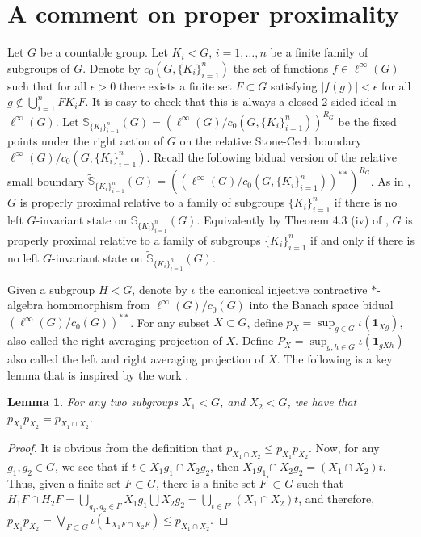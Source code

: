 \documentclass[11pt]{amsart}
\newtheorem{lem}[thm]{Lemma}
\theoremstyle{definition}
\begin{document}
\section{A comment on proper proximality}\label{pp section}

Let $G$ be a countable group.  Let $K_i<G$, $i=1,\hdots, n$ be a finite family of subgroups of $G$. Denote by $c_0(G,\{K_i\}_{i=1}^{n})$ the set of functions $f\in \ell^\infty(G)$ such that for all $\epsilon>0$ there exists a finite set $F\subset G$ satisfying $|f(g)|<\epsilon$ for all $g\notin \bigcup_{i=1}^{n}FK_iF$. It is easy to check that this is always a closed 2-sided ideal in $\ell^\infty(G)$. Let $\mathbb{S}_{\{K_{i}\}_{i=1}^{n}}(G)=\left(\ell^{\infty}(G)/c_0(G,\{K_i\}_{i=1}^{n})\right)^{R_{G}}$ be the fixed points under the right action of $G$ on the relative Stone-Cech boundary $\ell^{\infty}(G)/c_0(G,\{K_i\}_{i=1}^{n})$. Recall the following  bidual version of the relative small boundary $\widetilde{\mathbb{S}}_{\{K_{i}\}_{i=1}^{n}}(G)= \left(\left(\ell^{\infty}(G)/c_0(G,\{K_i\}_{i=1}^{n})\right)^{**}\right)^{R_{G}}$. As in \cite{BIP18}, $G$ is properly proximal relative to a family of subgroups $\{K_i\}_{i=1}^{n}$ if there is no left $G$-invariant state on $\mathbb{S}_{\{K_{i}\}_{i=1}^{n}}(G)$. Equivalently by Theorem 4.3 (iv) of \cite{BIP18},   $G$ is properly proximal relative to a family of subgroups $\{K_i\}_{i=1}^{n}$ if and only if there is no left $G$-invariant state on $\widetilde{\mathbb{S}}_{\{K_{i}\}_{i=1}^{n}}(G)$.

Given a subgroup $H<G$, denote by $\iota$ the canonical injective contractive $*$-algebra homomorphism from $\ell^\infty(G)/c_0(G)$  into the Banach space bidual $\left(\ell^\infty(G)/c_0(G)\right)^{**}$. For any subset $X\subset G$, define $p_X= \sup_{g\in G} \iota (\mathbf{1}_{Xg})$, also called the right averaging projection of $X$. Define $P_X= \sup_{g,h\in G} \iota (\mathbf{1}_{gXh})$ also called the left and right averaging projection of $X$. The following is a  key lemma that is inspired by the work \cite{DKE21}.  

\begin{lem}\label{intersection}
For any two subgroups $X_1< G$, and $X_2< G$, we have that $p_{X_1}p_{X_2}= p_{X_1\cap X_2}$.       
\end{lem}

\begin{proof}
It is obvious from the definition that $p_{X_1\cap X_2}\le p_{X_1}p_{X_2}$.
Now, for any $g_1, g_2\in G$, we see that if $t\in X_1g_1\cap X_2g_2$, then $X_1g_1\cap X_2g_2= (X_1\cap X_2)t$.
Thus, given a finite set $F\subset G$, there is a finite set $F^\prime\subset G$ such that
$H_1F\cap H_2F= \bigcup_{g_1,g_2\in F} X_1g_1 \bigcup  X_2g_2= \bigcup_{t\in F'} (X_1\cap  X_2)t$, and therefore, $p_{X_1}p_{X_2}= \bigvee_{F\subset G} \iota(\mathbf{1}_{X_1F\cap X_2F})\leq p_{X_1\cap X_2}$.
%
\end{proof}
\end{document}
